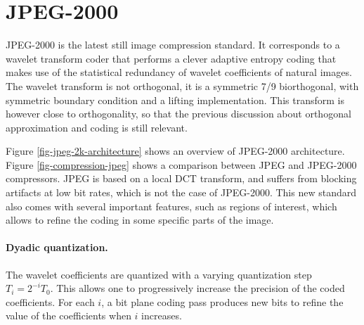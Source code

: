 


\section{JPEG-2000}

JPEG-2000 is the latest still image compression standard. It corresponds to a wavelet transform coder that performs a clever adaptive entropy coding that makes use of the statistical redundancy of wavelet coefficients of natural images. The wavelet transform is not orthogonal, it is a symmetric 7/9 biorthogonal, with symmetric boundary condition and a lifting implementation. This transform is however close to orthogonality, so that the previous discussion about orthogonal approximation and coding is still relevant.


Figure \ref{fig-jpeg-2k-architecture} shows an overview of JPEG-2000 architecture. Figure \ref{fig-compression-jpeg} shows a comparison between JPEG and JPEG-2000 compressors. JPEG is based on a local DCT transform, and suffers from blocking artifacts at low bit rates, which is not the case of JPEG-2000. This new standard also comes with several important features, such as regions of interest, which allows to refine the coding in some specific parts of the image.
 


\paragraph{Dyadic quantization.}

The wavelet coefficients are quantized with a varying quantization step $T_i = 2^{-i}T_0$. This allows one to progressively increase the precision of the coded coefficients. For each $i$, a bit plane coding pass produces new bits to refine the value of the coefficients when $i$ increases. 

